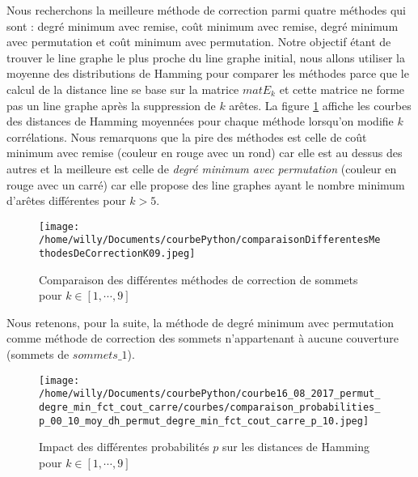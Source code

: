 \documentclass[onecolumn, 12pt]{book}
\begin{document}

Nous recherchons la meilleure m\'ethode de correction parmi quatre m\'ethodes qui sont : degr\'e minimum avec remise, co\^ut minimum avec remise, degr\'e minimum avec permutation et co\^ut minimum avec permutation.  
Notre objectif \'etant de trouver le line graphe le plus proche du line graphe initial, nous allons utiliser la moyenne des distributions de Hamming pour comparer les m\'ethodes parce que le calcul de la distance line se base sur la matrice $matE_k$ et cette matrice ne forme pas un line graphe apr\`es la suppression de $k$ ar\^etes. 
La figure \ref{compareDifferentesMethodesCorrectionSommets} affiche les courbes des distances de Hamming moyenn\'ees pour chaque m\'ethode lorsqu'on modifie $k$ corr\'elations.
Nous remarquons que la pire des m\'ethodes est celle de co\^ut minimum avec remise (couleur en rouge avec un rond) car elle est au dessus des autres et la meilleure est celle de {\em degr\'e minimum avec permutation} (couleur en rouge avec un carr\'e) car elle propose des line graphes ayant  le nombre minimum d'ar\^etes diff\'erentes pour $k > 5$.\newline
\begin{centering} 
\begin{figure}[htb!] 
\texttt{[image: /home/willy/Documents/courbePython/comparaisonDifferentesMethodesDeCorrectionK09.jpeg]}
\caption{ Comparaison des diff\'erentes m\'ethodes de correction de sommets pour $k \in [1,\cdots,9]$ }
\label{compareDifferentesMethodesCorrectionSommets} 
\end{figure}
\end{centering} 
Nous retenons, pour la suite, la m\'ethode de degr\'e minimum avec permutation comme m\'ethode de correction des sommets n'appartenant \`a aucune couverture (sommets de $sommets\_1$).
\newline

\begin{centering} 
\begin{figure}[htb!] 
\texttt{[image: /home/willy/Documents/courbePython/courbe16\_08\_2017\_permut\_degre\_min\_fct\_cout\_carre/courbes/comparaison\_probabilities\_p\_00\_10\_moy\_dh\_permut\_degre\_min\_fct\_cout\_carre\_p\_10.jpeg]}
\caption{ Impact des diff\'erentes probabilit\'es $p$ sur les distances de Hamming pour $k \in [1,\cdots,9]$ }
\label{compareDifferentesMethodesCorrectionSommetsP01} 
\end{figure}
\end{centering} 
\end{document}
